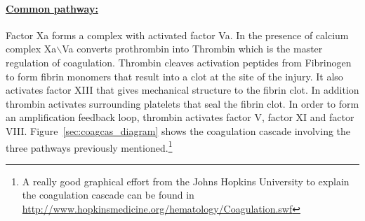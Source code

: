 \documentclass[%
 nofootinbib,
 amsmath,amssymb,
 aps,
 pra,
]{revtex4-1}
\begin{document}
\paragraph{\underline{Common pathway:}}
Factor Xa forms a complex with activated factor Va. In the presence of calcium complex Xa$\backslash$Va converts prothrombin into Thrombin which is the master regulation of coagulation. Thrombin cleaves activation peptides from Fibrinogen to form fibrin monomers that result into a clot at the site of the injury. It also activates factor XIII that gives mechanical structure to the fibrin clot. In addition thrombin activates surrounding platelets that seal the fibrin clot. In order to form an amplification feedback loop, thrombin activates factor V, factor XI and factor VIII. Figure~\ref{sec:coagcas_diagram} shows the coagulation cascade involving the three pathways previously mentioned.\footnote{A really good graphical effort from the Johns Hopkins University to explain the coagulation cascade can be found in \url{http://www.hopkinsmedicine.org/hematology/Coagulation.swf}}\\
\end{document}
